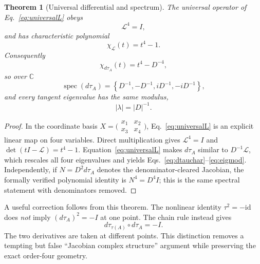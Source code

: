 \documentclass[11pt]{article}
\newtheorem{theorem}{Theorem}[section]
\theoremstyle{definition}\newtheorem{definition}[theorem]{Definition}
\theoremstyle{remark}\newtheorem{remark}[theorem]{Remark}\newtheorem{conjecture}[theorem]{Conjecture}
\begin{document}
\begin{theorem}[Universal differential and spectrum]\label{thm:grassdiff}
The universal operator of Eq.~\eqref{eq:universalL} obeys
\begin{equation}\label{eq:L4}
 \boxed{\mathcal L^4=I},
\end{equation}
and has characteristic polynomial
\begin{equation}\label{eq:Lchar}
 \chi_{\mathcal L}(t)=t^4-1.
\end{equation}
Consequently
\begin{equation}\label{eq:dtauchar}
 \boxed{\chi_{d\tau_A}(t)=t^4-D^{-4}},
\end{equation}
so over $\mathbb C$
\begin{equation}\label{eq:dtauspec}
 \operatorname{spec}(d\tau_A)
 =\left\{D^{-1},-D^{-1},iD^{-1},-iD^{-1}\right\},
\end{equation}
and every tangent eigenvalue has the same modulus,
\begin{equation}\label{eq:eigmod}
 \boxed{|\lambda|=|D|^{-1}}.
\end{equation}
\end{theorem}
\begin{proof}
In the coordinate basis $X=\bigl(\begin{smallmatrix}x_1&x_2\\x_3&x_4\end{smallmatrix}\bigr)$, Eq.~\eqref{eq:universalL} is an explicit linear map on four variables. Direct multiplication gives $\mathcal L^4=I$ and $\det(tI-\mathcal L)=t^4-1$. Equation~\eqref{eq:universalL} makes $d\tau_A$ similar to $D^{-1}\mathcal L$, which rescales all four eigenvalues and yields Eqs.~\eqref{eq:dtauchar}--\eqref{eq:eigmod}. Independently, if $N=D^2d\tau_A$ denotes the denominator-cleared Jacobian, the formally verified polynomial identity is $N^4=D^4I$; this is the same spectral statement with denominators removed.
\end{proof}

A useful correction follows from this theorem. The nonlinear identity $\tau^2=-\mathrm{id}$ does \emph{not} imply $(d\tau_A)^2=-I$ at one point. The chain rule instead gives
\begin{equation}\label{eq:chaincorrect}
 d\tau_{\tau(A)}\circ d\tau_A=-I.
\end{equation}
The two derivatives are taken at different points. This distinction removes a tempting but false ``Jacobian complex structure'' argument while preserving the exact order-four geometry.
\end{document}
